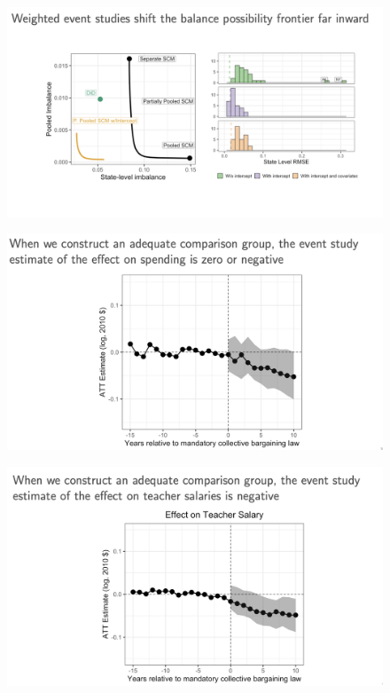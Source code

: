 \documentclass{beamer}
\begin{document}
\begin{frame}[plain]

	\begin{figure}
	\includegraphics[scale=0.4]{./lecture_includes/augsynth_29.png}
	\end{figure}

\end{frame}
\begin{frame}[plain]

	\begin{figure}
	\includegraphics[scale=0.4]{./lecture_includes/augsynth_30.png}
	\end{figure}

\end{frame}
\begin{frame}[plain]

	\begin{figure}
	\includegraphics[scale=0.4]{./lecture_includes/augsynth_31.png}
	\end{figure}

\end{frame}
\end{document}
